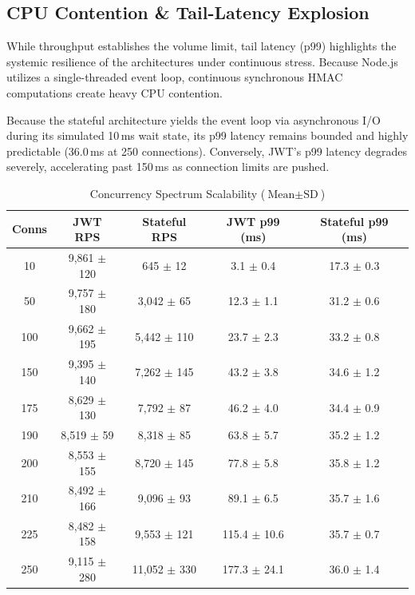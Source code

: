 \documentclass[conference]{IEEEtran}
\begin{document}
\subsection{CPU Contention \& Tail-Latency Explosion}
While throughput establishes the volume limit, tail latency (p99) highlights the systemic resilience of the architectures under continuous stress. Because Node.js utilizes a single-threaded event loop, continuous synchronous HMAC computations create heavy CPU contention.

Because the stateful architecture yields the event loop via asynchronous I/O during its simulated 10\,ms wait state, its p99 latency remains bounded and highly predictable (36.0\,ms at 250 connections). Conversely, JWT's p99 latency degrades severely, accelerating past 150\,ms as connection limits are pushed.

\begin{table}[htbp]
\caption{Concurrency Spectrum Scalability ($\text{Mean} \pm \text{SD}$)}
\begin{center}
\begin{tabular}{ccccc}
\toprule
\textbf{Conns} & \textbf{JWT RPS} & \textbf{Stateful RPS} & \textbf{JWT p99 (ms)} & \textbf{Stateful p99 (ms)} \\
\midrule
10  & 9,861 $\pm$ 120 & 645 $\pm$ 12   & 3.1 $\pm$ 0.4   & 17.3 $\pm$ 0.3 \\
50  & 9,757 $\pm$ 180 & 3,042 $\pm$ 65  & 12.3 $\pm$ 1.1  & 31.2 $\pm$ 0.6 \\
100 & 9,662 $\pm$ 195 & 5,442 $\pm$ 110 & 23.7 $\pm$ 2.3  & 33.2 $\pm$ 0.8 \\
150 & 9,395 $\pm$ 140 & 7,262 $\pm$ 145 & 43.2 $\pm$ 3.8  & 34.6 $\pm$ 1.2 \\
175 & 8,629 $\pm$ 130 & 7,792 $\pm$ 87  & 46.2 $\pm$ 4.0  & 34.4 $\pm$ 0.9 \\
190 & 8,519 $\pm$ 59  & 8,318 $\pm$ 85  & 63.8 $\pm$ 5.7  & 35.2 $\pm$ 1.2 \\
200 & 8,553 $\pm$ 155 & 8,720 $\pm$ 145 & 77.8 $\pm$ 5.8  & 35.8 $\pm$ 1.2 \\
210 & 8,492 $\pm$ 166 & 9,096 $\pm$ 93  & 89.1 $\pm$ 6.5  & 35.7 $\pm$ 1.6 \\
225 & 8,482 $\pm$ 158 & 9,553 $\pm$ 121 & 115.4 $\pm$ 10.6 & 35.7 $\pm$ 0.7 \\
250 & 9,115 $\pm$ 280 & 11,052 $\pm$ 330 & 177.3 $\pm$ 24.1 & 36.0 $\pm$ 1.4 \\
\bottomrule
\end{tabular}
\end{center}
\end{table}
\end{document}

